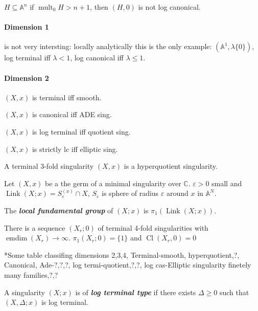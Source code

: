 \begin{exercise}
	$H\subseteq \mathbb{A}^{n}$ if $\operatorname{mult}_{0}H>n+1$, then $(H,0)$ is not log canonical.
\end{exercise}

\paragraph{Dimension 1} {\color{blue}is not very intersting:} locally analytically this is the only example: $(\mathbb{A}^{1},\lambda \{0\} )$, log terminal iff $\lambda<1$, log canonical iff $\lambda\leq 1$.

\paragraph{Dimension 2}

$(X,x)$ is terminal iff smooth.

$(X,x)$ is canonical iff ADE sing.

$(X,x)$ is log terminal iff quotient sing.

$(X,x)$ is strictly lc iff elliptic sing.

\begin{thm}[Reid, 80's]\leavevmode
	A terminal 3-fold singularity $(X,x)$ is a hyperquotient singularity.
\end{thm}

\begin{defn}
	Let $(X,x)$ be a the germ of a minimal singularity over $\mathbb{C}$. $\varepsilon >0$ small and $\operatorname{Link}(X;x)=S_{\varepsilon }^{(x)} \cap X$, $S_{\varepsilon }$ is sphere of radius $\varepsilon $ around $x$ in $\mathbb{A}^{N}$.

	The \textit{\textbf{local fundamental group}} of  $(X;x)$ is $\pi_{1}(\operatorname{Link}(X;x)) $.
\end{defn}

\begin{thm}[Kollár, 2010]\leavevmode
There is a sequence $(X_{r};0)$ of terminal 4-fold singularities with $\operatorname{emdim }(X_ {r})\to \infty$. $\pi_{1}(X_{r};0) =\{1\} $ and $\operatorname{Cl}(X_{r},0)=0$
\end{thm}

{\color{magenta}*Some table classifing dimensions 2,3,4, Terminal-smooth, hyperquotient,?, Canonical, Ade-?,?,?, log termi-quotient,?,?, log cas-Elliptic singularity finetely many families,?,?}

\begin{defn}
	A singularity $(X;x)$ is of  \textit{\textbf{log terminal type}} if there exists $\Delta \geq 0$ such that $(X,\Delta;x)$ is log terminal.
\end{defn}

